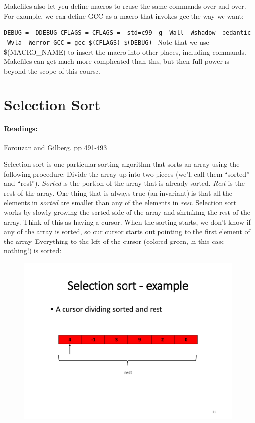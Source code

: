 \documentclass{article}
\begin{document}
\begin{flushleft}
\begin{flushleft}
Makefiles also let you define macros to reuse the same commands over and over. For example,
we can define GCC as a macro that invokes gcc the way we want:\end{flushleft}
\linebreak
\linebreak
\texttt{DEBUG = -DDEBUG \linebreak
CFLAGS = CFLAGS = -std=c99 -g -Wall -Wshadow --pedantic -Wvla -Werror \linebreak
GCC = gcc \$(CFLAGS) \$(DEBUG) } 
\linebreak
\linebreak
Note that we use \$(MACRO\_NAME) to insert the macro into other places, including commands.
Makefiles can get much more complicated than this, but their full power is beyond the scope of
this course.


\section{Selection Sort}
\paragraph{Readings:} Forouzan and Gilberg, pp 491-493

Selection sort is one particular sorting algorithm that sorts an array using the following procedure: Divide the array up into two pieces (we'll call them ``sorted'' and ``rest''). \emph{Sorted} is the portion of
the array that is already sorted. \emph{Rest} is the rest of the array. One thing that is always true (an invariant) is that all the elements in \emph{sorted} are smaller than any of the elements in \emph{rest}.
Selection sort works by slowly growing the sorted side of the array and shrinking the rest of the array. Think of this as having a cursor. When the sorting starts, we don't know if any of the array 
is sorted, so our cursor starts out pointing to the first element of the array. Everything to the left of the cursor (colored green, in this case nothing!) is sorted:

\begin{figure}[H]
\centering
\includegraphics[scale=0.5]{Fig1}
\end{figure}


\end{flushleft}
\end{document}
